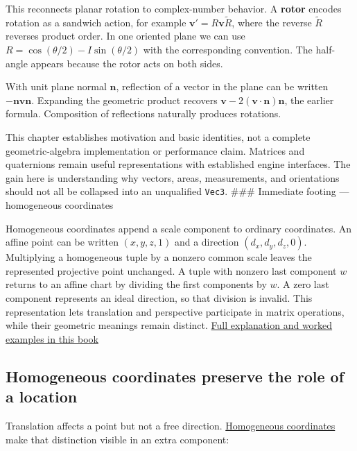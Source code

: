 This reconnects planar rotation to complex-number behavior. A \textbf{rotor} encodes rotation as a sandwich action, for example \(\mathbf v'=R\mathbf v\widetilde R\), where the reverse \(\widetilde R\) reverses product order. In one oriented plane we can use \(R=\cos(\theta/2)-I\sin(\theta/2)\) with the corresponding convention. The half-angle appears because the rotor acts on both sides.

With unit plane normal \(\mathbf n\), reflection of a vector in the plane can be written \(-\mathbf n\mathbf v\mathbf n\). Expanding the geometric product recovers \(\mathbf v-2(\mathbf v\cdot\mathbf n)\mathbf n\), the earlier formula. Composition of reflections naturally produces rotations.

This chapter establishes motivation and basic identities, not a complete geometric-algebra implementation or performance claim. Matrices and quaternions remain useful representations with established engine interfaces. The gain here is understanding why vectors, areas, measurements, and orientations should not all be collapsed into an unqualified \texttt{Vec3}. \#\#\# Immediate footing --- homogeneous coordinates

Homogeneous coordinates append a scale component to ordinary coordinates. An affine point can be written \((x,y,z,1)\) and a direction \((d_x,d_y,d_z,0)\). Multiplying a homogeneous tuple by a nonzero common scale leaves the represented projective point unchanged. A tuple with nonzero last component \(w\) returns to an affine chart by dividing the first components by \(w\). A zero last component represents an ideal direction, so that division is invalid. This representation lets translation and perspective participate in matrix operations, while their geometric meanings remain distinct. \hyperref[01-foundations-i-ch018-homogeneous-coordinates-preserve-the-role-of-a-location]{Full explanation and worked examples in this book}

\subsection{Homogeneous coordinates preserve the role of a location}\label{01-foundations-i-ch018-homogeneous-coordinates-preserve-the-role-of-a-location}

\hypertarget{01-foundations-i-ch018-homogeneous-coordinates-preserve-the-role-of-a-location}{}

Translation affects a point but not a free direction. \hyperref[01-foundations-i-ch019-figure-m6---follow-one-point-through-named-spaces]{Homogeneous coordinates} make that distinction visible in an extra component:

